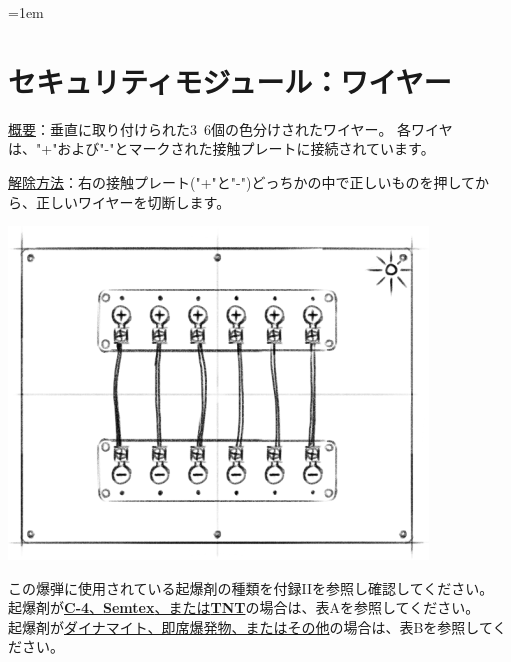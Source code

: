 \begin{minipage}{0.63\textwidth}
    \parskip=1em
    \section*{セキュリティモジュール：ワイヤー}
    
    \uline{概要}：垂直に取り付けられた3\string~6個の色分けされたワイヤー。 各ワイヤは{、}"+"および"-"とマークされた接触プレートに接続されています。
    
    \uline{解除方法}：右の接触プレート("+"と"-")どっちかの中で正しいものを押してから、正しいワイヤーを切断します。
\end{minipage}%
\hfill%
\begin{minipage}{0.33\textwidth}
    \includegraphics[width=\textwidth]{images/21.png}
    \vspace*{\fill}
\end{minipage}

この爆弾に使用されている起爆剤の種類を付録IIを参照し確認してください。\\
起爆剤が\uline{\textbf{C-4}、\textbf{Semtex}、または\textbf{TNT}}の場合は、表Aを参照してください。\\
起爆剤が\uline{ダイナマイト、即席爆発物、またはその他}の場合は、表Bを参照してください。

